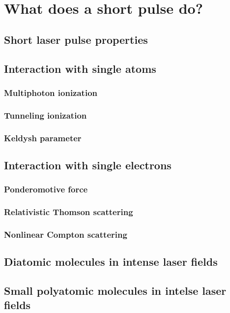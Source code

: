 \chapter{What does a short pulse do?}\label{ch:ShortPulseDoes}

\section{Short laser pulse properties}
\section{Interaction with single atoms}
\subsection{Multiphoton ionization}
\subsection{Tunneling ionization}
\subsection{Keldysh parameter}
\section{Interaction with single electrons}
\subsection{Ponderomotive force}
\subsection{Relativistic Thomson scattering}
\subsection{Nonlinear Compton scattering}
\section{Diatomic molecules in intense laser fields} 
\section{Small polyatomic molecules in intelse laser fields}
